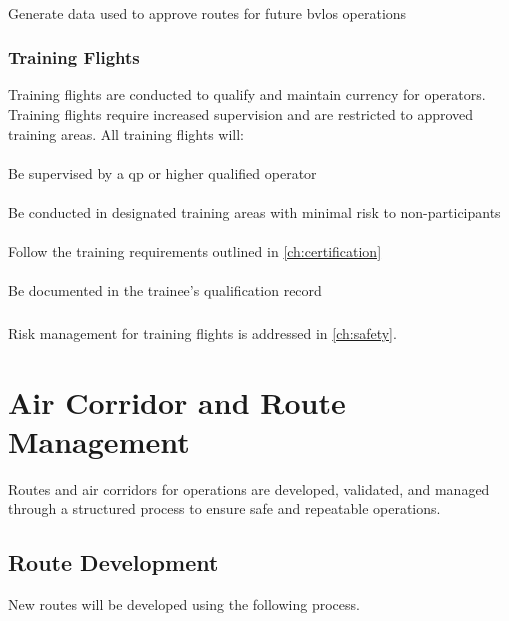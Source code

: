         \paragraph{} Generate data used to approve routes for future \ac{bvlos} operations
    
    
    \subsubsection{Training Flights}\label{ssec:trainingflights} Training flights are conducted to qualify and maintain currency for \projectmars{} operators. Training flights require increased supervision and are restricted to approved training areas. All training flights will:
    
        \paragraph{} Be supervised by a \ac{qp} or higher qualified operator
        \paragraph{} Be conducted in designated training areas with minimal risk to non-participants
        \paragraph{} Follow the training requirements outlined in \cref{ch:certification}
        \paragraph{} Be documented in the trainee's qualification record
    
        \subsubsection{} Risk management for training flights is addressed in \cref{ch:safety}.

\section{Air Corridor and Route Management}\label{sec:aircorridormgmt}
Routes and air corridors for \projectmars{} operations are developed, validated, and managed through a structured process to ensure safe and repeatable operations.

    \subsection{Route Development}\label{ssec:routedevelopment} New routes will be developed using the following process.

